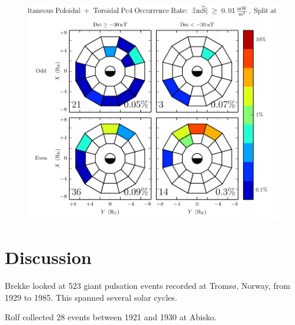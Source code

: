 \begin{figure}[!htb]
    \centering
    \includegraphics[width=\textwidth]{figures/double_rate.pdf}
    \caption[Dual Poloidal + Toroidal Pc4 Events]{
      \todo{$\cdots$}
    }
    \label{fig_double_rate}
\end{figure}


\section{Discussion}

\todo{$\cdots$}






Brekke\cite{brekke_1987} looked at 523 giant pulsation events recorded at Troms{\o}, Norway, from 1929 to 1985. This spanned several solar cycles. 

Rolf\cite{rolf_1931} collected 28 events between 1921 and 1930 at Abisko. 

